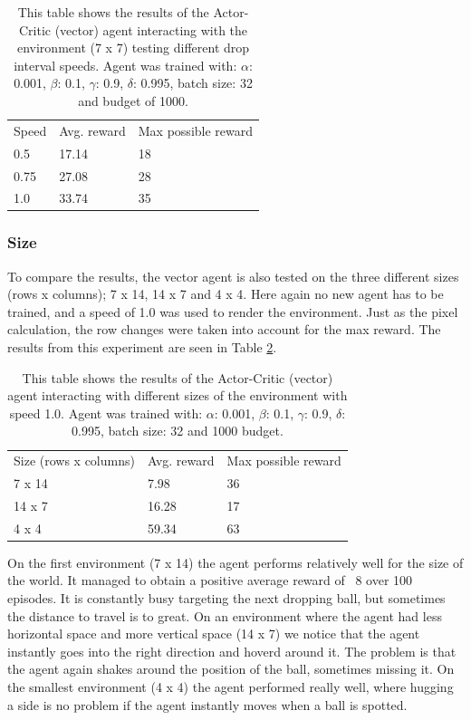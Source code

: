 \documentclass{article}
\begin{document}
\begin{table}[]
\begin{tabular}{lll}
Speed & Avg. reward & Max possible reward \\
0.5   & 17.14       & 18                  \\
0.75   & 27.08       & 28                  \\
1.0   & 33.74        & 35                 
\end{tabular}
\caption{This table shows the results of the Actor-Critic (vector) agent interacting with the environment (7 x 7) testing different drop interval speeds. Agent was trained with: $\alpha$: 0.001, $\beta$: 0.1, $\gamma$: 0.9, $\delta$: 0.995, batch size: 32 and budget of 1000. }
\label{tab:Vector-speed}
\end{table}

\subsubsection{Size}
To compare the results, the vector agent is also tested on the three different sizes (rows x columns); 7 x 14, 14 x 7 and 4 x 4. 
Here again no new agent has to be trained, and a speed of 1.0 was used to render the environment. 
Just as the pixel calculation, the row changes were taken into account for the max reward. 
The results from this experiment are seen in Table \ref{tab:Vector-size}.

\begin{table}[]
\begin{tabular}{lll}
Size (rows x columns) & Avg. reward & Max possible reward \\
7 x 14                & 7.98       & 36                  \\
14 x 7                & 16.28       & 17                  \\
4 x 4                 & 59.34       & 63                 
\end{tabular}
\caption{This table shows the results of the Actor-Critic (vector) agent interacting with different sizes of the environment with speed 1.0. 
Agent was trained with: $\alpha$: 0.001, $\beta$: 0.1, $\gamma$: 0.9, $\delta$: 0.995, batch size: 32 and 1000 budget. }
\label{tab:Vector-size}
\end{table}

On the first environment (7 x 14) the agent performs relatively well for the size of the world.
It managed to obtain a positive average reward of ~8 over 100 episodes. 
It is constantly busy targeting the next dropping ball, but sometimes the distance to travel is to great.
On an environment where the agent had less horizontal space and more vertical space (14 x 7) we notice that the agent instantly goes into the right direction and hoverd around it.
The problem is that the agent again shakes around the position of the ball, sometimes missing it. 
On the smallest environment (4 x 4) the agent performed really well, where hugging a side is no problem if the agent instantly moves when a ball is spotted.
\end{document}
